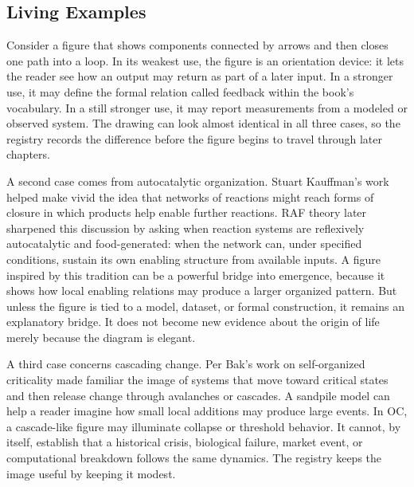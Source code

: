 \documentclass[11pt,a4paper,openany]{book}
\begin{document}
\subsection{Living Examples}
Consider a figure that shows components connected by arrows and then closes one path into a loop. In its weakest use, the figure is an orientation device: it lets the reader see how an output may return as part of a later input. In a stronger use, it may define the formal relation called feedback within the book's vocabulary. In a still stronger use, it may report measurements from a modeled or observed system. The drawing can look almost identical in all three cases, so the registry records the difference before the figure begins to travel through later chapters. \cite{kauffman_autocatalytic,raf_networks}\par
A second case comes from autocatalytic organization. Stuart Kauffman's work helped make vivid the idea that networks of reactions might reach forms of closure in which products help enable further reactions. RAF theory later sharpened this discussion by asking when reaction systems are reflexively autocatalytic and food-generated: when the network can, under specified conditions, sustain its own enabling structure from available inputs. A figure inspired by this tradition can be a powerful bridge into emergence, because it shows how local enabling relations may produce a larger organized pattern. But unless the figure is tied to a model, dataset, or formal construction, it remains an explanatory bridge. It does not become new evidence about the origin of life merely because the diagram is elegant.\par
A third case concerns cascading change. Per Bak's work on self-organized criticality made familiar the image of systems that move toward critical states and then release change through avalanches or cascades. A sandpile model can help a reader imagine how small local additions may produce large events. In OC, a cascade-like figure may illuminate collapse or threshold behavior. It cannot, by itself, establish that a historical crisis, biological failure, market event, or computational breakdown follows the same dynamics. The registry keeps the image useful by keeping it modest.\par
\end{document}
